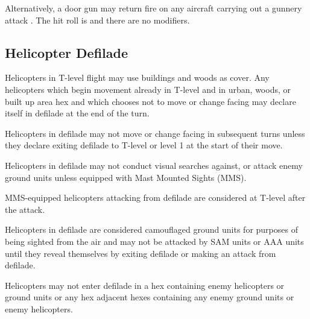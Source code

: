 {{        Alternatively, a door gun may return fire on any aircraft carrying out a gunnery attack . The hit roll is  and there are no modifiers.

    }

    \subsection{Helicopter Defilade}

    Helicopters in T-level flight may use buildings and woods as cover.  Any helicopters which begin movement already in T-level and in urban, woods, or built up area hex and which chooses not to move or change facing may declare itself in defilade at the end of the turn.

    Helicopters in defilade may not move or change facing in subsequent turns unless they declare exiting defilade to T-level or level 1 at the start of their move.

    Helicopters in defilade may not conduct visual searches against, or attack enemy ground units unless equipped with Mast Mounted Sights (MMS).

    MMS-equipped helicopters attacking from defilade are considered at T-level after the attack.

    Helicopters in defilade are considered camouflaged ground units for purposes of being sighted from the air and may not be attacked by SAM units or AAA units until they reveal themselves by exiting defilade or making an attack from defilade.

    Helicopters may not enter defilade in a hex containing enemy helicopters or ground units or any hex adjacent hexes containing any enemy ground units or enemy helicopters.

}